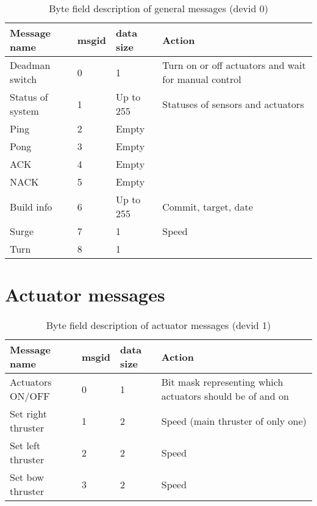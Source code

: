 \begin{table}[h]
	\centering
	\begin{tabular}{llll}
		\toprule
		\textbf{Message name}  & \textbf{msgid} & \textbf{data size} & \textbf{Action}\\
		\midrule
		Deadman switch & 0 & 1 & Turn on or off actuators and wait for manual control \\
		Status of system & 1 & Up to 255 & Statuses of sensors and actuators \\
		Ping & 2 & Empty \\
		Pong & 3& Empty \\
		ACK & 4 & Empty\\
		NACK & 5 & Empty\\
		Build info & 6 & Up to 255 & Commit, target, date\\
		Surge & 7 & 1 & Speed\\
		Turn & 8 & 1 &\\
		\bottomrule
	\end{tabular}
	\caption{Byte field description of general messages (devid 0)}
	\label{tab:ack}
\end{table}


\section{Actuator messages}
\begin{table}[h]
	\centering
	\begin{tabular}{llll}
		\toprule
		\textbf{Message name}  & \textbf{msgid} & \textbf{data size} & \textbf{Action}\\
		\midrule
		Actuators ON/OFF & 0 & 1 & Bit mask representing which actuators should be of and on\\
		Set right thruster & 1 & 2 & Speed (main thruster of only one) \\
		Set left thruster & 2 & 2 & Speed \\
		Set bow thruster & 3 & 2 & Speed \\
		\bottomrule
	\end{tabular}
	\caption{Byte field description of actuator messages (devid 1)}
	\label{tab:ack}
\end{table}

